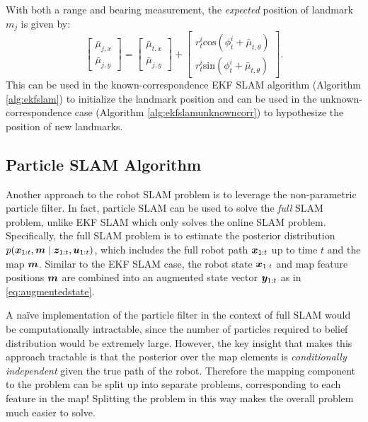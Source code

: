 \begin{example}
With both a range and bearing measurement, the \textit{expected} position of landmark $m_j$ is given by:
\begin{equation*}
    \begin{bmatrix}
    \bar{\mu}_{j,x} \\
    \bar{\mu}_{j,y}
    \end{bmatrix}
    = \begin{bmatrix}
    \bar{\mu}_{t,x}\\
    \bar{\mu}_{j,y}
    \end{bmatrix}
    +
    \begin{bmatrix}
    r^{i}_{t}\text{cos}(\phi^{i}_{t} + \bar{\mu}_{t,\theta}) \\
    r^{i}_{t}\text{sin}(\phi^{i}_{t} + \bar{\mu}_{t,\theta})
    \end{bmatrix}.
\end{equation*}
This can be used in the known-correspondence EKF SLAM algorithm (Algorithm \ref{alg:ekfslam}) to initialize the landmark position and can be used in the unknown-correspondence case (Algorithm \ref{alg:ekfslamunknowncorr}) to hypothesize the position of new landmarks.
\end{example}


\subsection{Particle SLAM Algorithm}
Another approach to the robot SLAM problem is to leverage the non-parametric particle filter. In fact, particle SLAM can be used to solve the \textit{full} SLAM problem, unlike EKF SLAM which only solves the online SLAM problem. Specifically, the full SLAM problem is to estimate the posterior distribution $p(\bm{x}_{1:t}, \bm{m} \mid \bm{z}_{1:t}, \bm{u}_{1:t})$, which includes the full robot path $\bm{x}_{1:t}$ up to time $t$ and the map $\bm{m}$. Similar to the EKF SLAM case, the robot state $\bm{x}_{1:t}$ and map feature positions $\bm{m}$ are combined into an augmented state vector $\bm{y}_{1:t}$ as in \eqref{eq:augmentedstate}.

A na\"ive implementation of the particle filter in the context of full SLAM would be computationally intractable, since the number of particles required to belief distribution would be extremely large. However, the key insight that makes this approach tractable is that the posterior over the map elements is \textit{conditionally independent} given the true path of the robot. Therefore the mapping component to the problem can be split up into separate problems, corresponding to each feature in the map! Splitting the problem in this way makes the overall problem much easier to solve.

